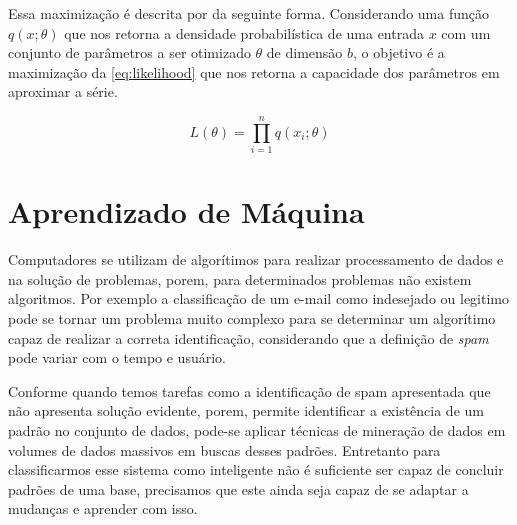 \documentclass[
    12pt,
    oneside,
    a4paper,
    english,
    brazil
]{abntex2}
\begin{document}
Essa  maximização   é  descrita   por     da  seguinte
forma.  Considerando  uma função  $q(x;\theta)$  que  nos retorna  a  densidade
probabilística de uma entrada $x$ com um conjunto de parâmetros a ser otimizado
$\theta$ de dimensão $b$, o objetivo é a maximização da \autoref{eq:likelihood}
que nos retorna a capacidade dos parâmetros em aproximar a série.

\begin{equation}\label{eq:likelihood}
    L(\theta) = \prod_{i=1}^{n}{q(x_i;\theta)}
\end{equation}

\section{Aprendizado de Máquina}

Computadores se utilizam de algorítimos  para realizar processamento de dados e
na  solução  de  problemas,  porem, para  determinados  problemas  não  existem
algoritmos.  Por  exemplo a  classificação  de  um  e-mail como  indesejado  ou
legitimo  pode se  tornar  um problema  muito complexo  para  se determinar  um
algorítimo  capaz  de realizar  a  correta  identificação, considerando  que  a
definição de \textit{spam} pode variar com o tempo e usuário.

Conforme  quando  temos tarefas como a  identificação de spam
apresentada que  não apresenta solução  evidente, porem, permite  identificar a
existência  de um  padrão no  conjunto de  dados, pode-se  aplicar técnicas  de
mineração  de dados  em volumes  de dados  massivos em  buscas desses  padrões.
Entretanto para classificarmos  esse sistema como inteligente  não é suficiente
ser capaz de concluir padrões de uma base, precisamos que este ainda seja capaz
de se adaptar a mudanças e aprender com isso.
\end{document}
